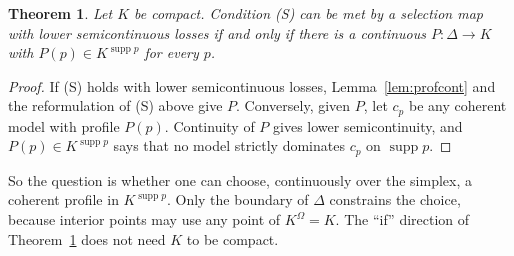\documentclass[11pt]{article}
\newtheorem{theorem}{Theorem}[section]
\theoremstyle{definition}
\theoremstyle{remark}
\newcommand{\supp}{\operatorname{supp}}
\begin{document}
\begin{theorem}\label{thm:selection}
Let $K$ be compact. Condition (S) can be met by a selection map with lower semicontinuous losses if and only if there is a continuous $P:\Delta\to K$ with $P(p)\in K^{\supp p}$ for every $p$.
\end{theorem}
\begin{proof}
If (S) holds with lower semicontinuous losses, Lemma~\ref{lem:profcont} and the reformulation of (S) above give $P$. Conversely, given $P$, let $c_p$ be any coherent model with profile $P(p)$. Continuity of $P$ gives lower semicontinuity, and $P(p)\in K^{\supp p}$ says that no model strictly dominates $c_p$ on $\supp p$.
\end{proof}
So the question is whether one can choose, continuously over the simplex, a coherent profile in $K^{\supp p}$. Only the boundary of $\Delta$ constrains the choice, because interior points may use any point of $K^\Omega=K$. The ``if'' direction of Theorem~\ref{thm:selection} does not need $K$ to be compact.
\end{document}
